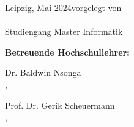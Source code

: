 \begin{titlepage}
\begin{center}
		\renewcommand{\arraystretch}{1}
  \end{center}
  
Leipzig, Mai 2024\hfill vorgelegt von \\[3mm]
\hspace*{\fill} {\large \myfirstname~\mylastname}\\
\hspace*{\fill} Studiengang Master Informatik

\vspace{1cm}

{\large\textbf{Betreuende Hochschullehrer:}}

{\large Dr. Baldwin Nsonga}\\
\quad \hspace{1cm} \myuni, \myworkinggroup

{\large Prof. Dr. Gerik Scheuermann}\\
\quad \myuni, \myworkinggroup
  \makeatother
\end{titlepage}

\newpage
\null
\thispagestyle{empty}
\newpage
